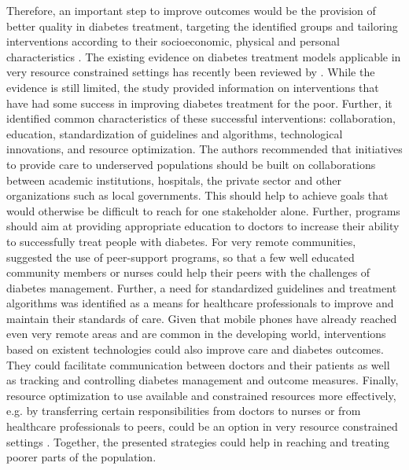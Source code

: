 Therefore, an important step to improve outcomes would be the provision of better quality in diabetes treatment, targeting the identified groups and tailoring interventions according to their socioeconomic, physical and personal characteristics \parencite{Cefalu2016}. The existing evidence on diabetes treatment models applicable in very resource constrained settings has recently been reviewed by \textcite{Esterson2014}. While the evidence is still limited, the study provided information on interventions that have had some success in improving diabetes treatment for the poor. Further, it identified common characteristics of these successful interventions: collaboration, education, standardization of guidelines and algorithms, technological innovations, and resource optimization. The authors recommended that initiatives to provide care to underserved populations should be built on collaborations between academic institutions, hospitals, the private sector and other organizations such as local governments. This should help to achieve goals that would otherwise be difficult to reach for one stakeholder alone. Further, programs should aim at providing appropriate education to doctors to increase their ability to successfully treat people with diabetes. For very remote communities, \textcite{Esterson2014} suggested the use of peer-support programs, so that a few well educated community members or nurses could help their peers with the challenges of diabetes management. Further, a need for standardized guidelines and treatment algorithms was identified as a means for healthcare professionals to improve and maintain their standards of care. Given that mobile phones have already reached even very remote areas and are common in the developing world, interventions based on existent technologies could also improve care and diabetes outcomes. They could facilitate communication between doctors and their patients as well as tracking and controlling diabetes management and outcome measures. Finally, resource optimization to use available and constrained resources more effectively, e.g. by transferring certain responsibilities from doctors to nurses or from healthcare professionals to peers, could be an option in very resource constrained settings \parencite{Esterson2014}. Together, the presented strategies could help in reaching and treating poorer parts of the population.

